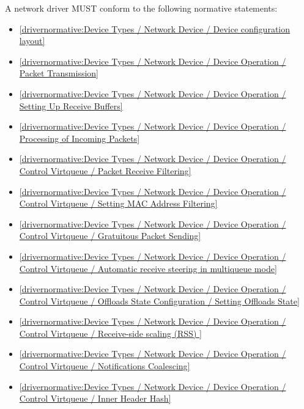 \label{sec:Conformance / Driver Conformance / Network Driver Conformance}

A network driver MUST conform to the following normative statements:

\begin{itemize}
\item \ref{drivernormative:Device Types / Network Device / Device configuration layout}
\item \ref{drivernormative:Device Types / Network Device / Device Operation / Packet Transmission}
\item \ref{drivernormative:Device Types / Network Device / Device Operation / Setting Up Receive Buffers}
\item \ref{drivernormative:Device Types / Network Device / Device Operation / Processing of Incoming Packets}
\item \ref{drivernormative:Device Types / Network Device / Device Operation / Control Virtqueue / Packet Receive Filtering}
\item \ref{drivernormative:Device Types / Network Device / Device Operation / Control Virtqueue / Setting MAC Address Filtering}
\item \ref{drivernormative:Device Types / Network Device / Device Operation / Control Virtqueue / Gratuitous Packet Sending}
\item \ref{drivernormative:Device Types / Network Device / Device Operation / Control Virtqueue / Automatic receive steering in multiqueue mode}
\item \ref{drivernormative:Device Types / Network Device / Device Operation / Control Virtqueue / Offloads State Configuration / Setting Offloads State}
\item \ref{drivernormative:Device Types / Network Device / Device Operation / Control Virtqueue / Receive-side scaling (RSS) }
\item \ref{drivernormative:Device Types / Network Device / Device Operation / Control Virtqueue / Notifications Coalescing}
\item \ref{drivernormative:Device Types / Network Device / Device Operation / Control Virtqueue / Inner Header Hash}
\end{itemize}
